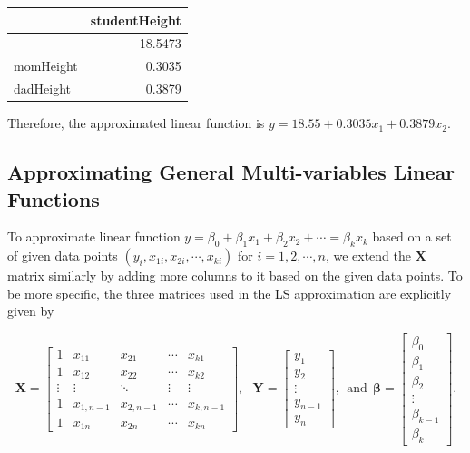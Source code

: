 \documentclass[
]{book}
\begin{document}
\begin{tabular}{l|r}
\hline
  & studentHeight\\
\hline
 & 18.5473\\
\hline
momHeight & 0.3035\\
\hline
dadHeight & 0.3879\\
\hline
\end{tabular}

Therefore, the approximated linear function is \(y = 18.55 + 0.3035x_1 + 0.3879x_2\).

\hfill\break

\hypertarget{approximating-general-multi-variables-linear-functions}{%
\subsection{Approximating General Multi-variables Linear Functions}\label{approximating-general-multi-variables-linear-functions}}

To approximate linear function \(y = \beta_0 + \beta_1x_1 + \beta_2x_2 + \cdots = \beta_kx_k\) based on a set of given data points \((y_i, x_{1i}, x_{2i}, \cdots, x_{ki})\) for \(i = 1, 2, \cdots, n\), we extend the \(\mathbf{X}\) matrix similarly by adding more columns to it based on the given data points. To be more specific, the three matrices used in the LS approximation are explicitly given by

\[
\mathbf{X} =
\left[
\begin{array}{ccccc}
 1 & x_{11} & x_{21} & \cdots & x_{k1} \\
 1 & x_{12} & x_{22} & \cdots & x_{k2}\\
 \vdots & \vdots & \ddots & \vdots &\vdots\\
 1 & x_{1,n-1} & x_{2, n-1} & \cdots & x_{k,n-1}\\
 1 & x_{1n} & x_{2n} & \cdots & x_{kn}
\end{array}
\right],
~~~
\mathbf{Y} =
\left[
\begin{array}{c}
y_1 \\
y_2\\
\vdots\\
y_{n-1}\\
y_n
\end{array}
\right],
~~\text{and}~~
\mathbf{\beta} =
\left[
\begin{array}{c}
\beta_0 \\
\beta_1 \\
\beta_2 \\
\vdots \\
\beta_{k-1}\\
\beta_k
\end{array}
\right].
\]
\end{document}

